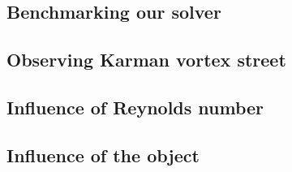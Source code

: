 \subsection{Benchmarking our solver}
\subsection{Observing Karman vortex street}
\subsection{Influence of Reynolds number}
\subsection{Influence of the object}
